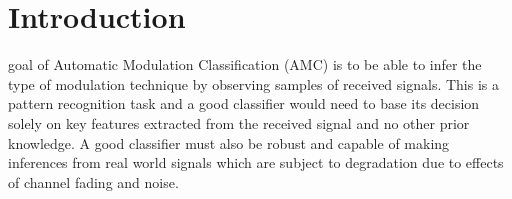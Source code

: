 \documentclass[journal,onecolumn]{IEEEtran}
\begin{document}








\maketitle



%
\IEEEpeerreviewmaketitle


\section{Introduction}
% 
% 
% 
% 
 goal of Automatic Modulation Classification (AMC) is to be able to infer the type of modulation technique by observing samples of received signals. This is a pattern recognition task and a good classifier would need to base its decision solely on key features extracted from the received signal and no other prior knowledge. A good classifier must also be robust and capable of making inferences from real world signals which are subject to degradation due to effects of channel fading and noise.
\end{document}
